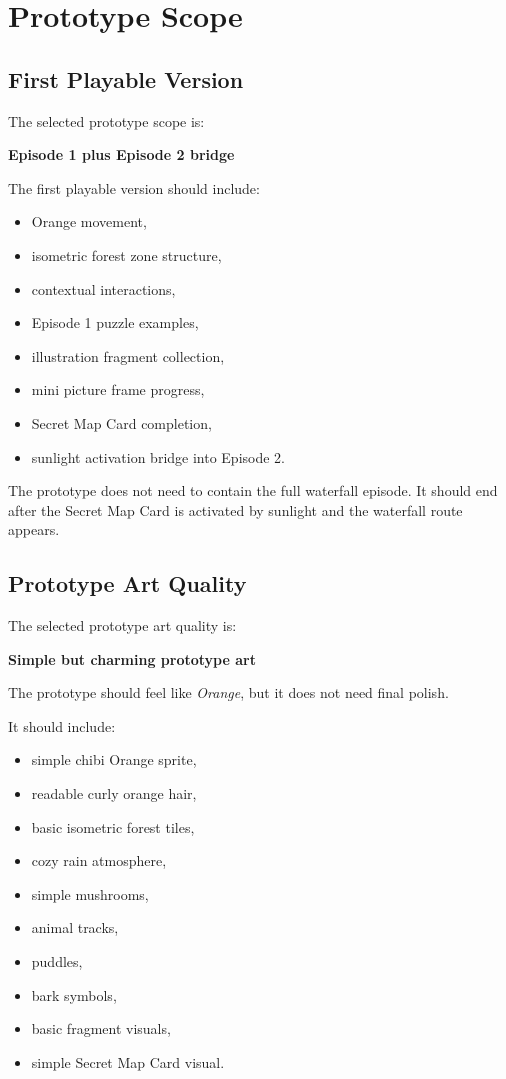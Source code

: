 \documentclass[12pt]{article}
\begin{document}
\section{Prototype Scope}

\subsection{First Playable Version}

The selected prototype scope is:

\begin{center}
\textbf{Episode 1 plus Episode 2 bridge}
\end{center}

The first playable version should include:

\begin{itemize}[leftmargin=*]
    \item Orange movement,
    \item isometric forest zone structure,
    \item contextual interactions,
    \item Episode 1 puzzle examples,
    \item illustration fragment collection,
    \item mini picture frame progress,
    \item Secret Map Card completion,
    \item sunlight activation bridge into Episode 2.
\end{itemize}

The prototype does not need to contain the full waterfall episode. It should end after the Secret Map Card is activated by sunlight and the waterfall route appears.

\subsection{Prototype Art Quality}

The selected prototype art quality is:

\begin{center}
\textbf{Simple but charming prototype art}
\end{center}

The prototype should feel like \textit{Orange}, but it does not need final polish.

It should include:

\begin{itemize}[leftmargin=*]
    \item simple chibi Orange sprite,
    \item readable curly orange hair,
    \item basic isometric forest tiles,
    \item cozy rain atmosphere,
    \item simple mushrooms,
    \item animal tracks,
    \item puddles,
    \item bark symbols,
    \item basic fragment visuals,
    \item simple Secret Map Card visual.
\end{itemize}
\end{document}
